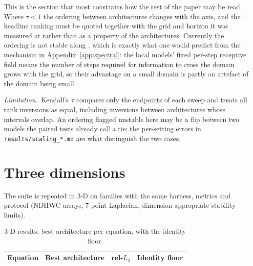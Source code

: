 \documentclass{article}
\newcommand{\code}[1]{\texttt{\small #1}}
\newcommand{\limitation}[1]{\par\smallskip\noindent\textit{Limitation.}~#1\par\smallskip}
\begin{document}
\begin{table}[h]
\centering
\caption{Rank stability along each scale axis on heat. $\tau = 1$ means the ordering is
unchanged; anything less means the paper's ranking is conditional on its operating point.}
\label{tab:scaling}
\small

\end{table}

This is the section that most constrains how the rest of the paper may be read. Where
$\tau < 1$ the ordering between architectures changes with the axis, and the headline
ranking must be quoted together with the grid and horizon it was measured at rather than
as a property of the architectures. Currently the ordering is not stable along
\scalingUnstableAxes{}, which is exactly what one would predict from the mechanism in
Appendix~\ref{app:spectral}: the local models' fixed per-step receptive field means the
number of steps required for information to cross the domain grows with the grid, so their
advantage on a small domain is partly an artefact of the domain being small.

\limitation{Kendall's $\tau$ compares only the endpoints of each sweep and treats all rank
inversions as equal, including inversions between architectures whose intervals overlap.
An ordering flagged unstable here may be a flip between two models the paired tests
already call a tie; the per-setting errors in \code{results/scaling\_*.md} are what
distinguish the two cases.}

\section{Three dimensions}
\label{sec:threed}

The suite is repeated in 3-D on \NpdesThreeD{} families with the same harness, metrics and
protocol (NDHWC arrays, 7-point Laplacian, dimension-appropriate stability limits).

\begin{table}[h]
\centering
\caption{3-D results: best architecture per equation, with the identity floor.}
\label{tab:threed}
\small
\begin{tabular}{llcc}
\toprule
Equation & Best architecture & rel-$L_2$ & Identity floor \\
\midrule

\bottomrule
\end{tabular}
\end{table}
\end{document}
